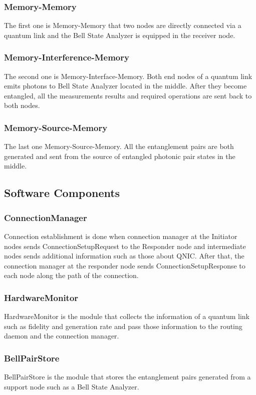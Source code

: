 \subsubsection{Memory-Memory}
The first one is Memory-Memory that two nodes are directly connected via a quantum link and the Bell State Analyzer is equipped in the receiver node.

\subsubsection{Memory-Interference-Memory}
The second one is Memory-Interface-Memory. Both end nodes of a quantum link emits photons to Bell State Analyzer located in the middle. After they become entangled, all the measurements results and required operations are sent back to both nodes.

\subsubsection{Memory-Source-Memory}
The last one Memory-Source-Memory. All the entanglement pairs are both generated and sent from the source of entangled photonic pair states in the middle.

\subsection{Software Components}

\subsubsection{ConnectionManager}

Connection establishment is done when connection manager at the Initiator nodes sends ConnectionSetupRequest to the Responder node and intermediate nodes sends additional information such as those about QNIC.
After that, the connection manager at the responder node sends ConnectionSetupResponse to each node along the path of the connection.

\subsubsection{HardwareMonitor}
HardwareMonitor is the module that collects the information of a quantum link such as fidelity and generation rate and pass those information to the routing daemon and the connection manager.

\subsubsection{BellPairStore}
BellPairStore is the module that stores the entanglement pairs generated from a support node such as a Bell State Analyzer.

